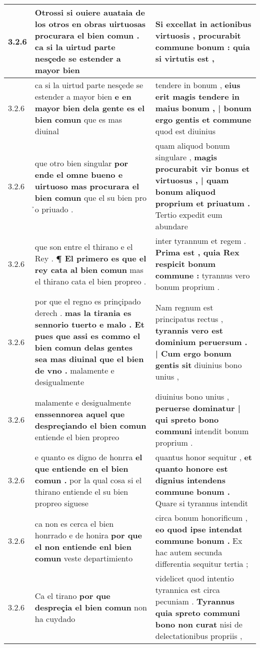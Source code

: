 \begin{tabular}{|p{1cm}|p{6.5cm}|p{6.5cm}|}
3.2.6 & Otrossi si ouiere auataia de los otros \textbf{ en obras uirtuosas procurara el bien comun . } ca si la uirtud parte nesçede se estender a mayor bien & Si excellat in actionibus virtuosis , \textbf{ procurabit commune bonum : } quia si virtutis est , \\\hline
3.2.6 & ca si la uirtud parte nesçede se estender a mayor bien \textbf{ e en mayor bien dela gente es el bien comun } que es mas diuinal & tendere in bonum , \textbf{ eius erit magis tendere in maius bonum , | bonum ergo gentis et commune } quod est diuinius \\\hline
3.2.6 & que otro bien singular \textbf{ por ende el omne bueno e uirtuoso mas procurara el bien comun } que el su bien pro ̉o priuado . & quam aliquod bonum singulare , \textbf{ magis procurabit vir bonus et virtuosus , | quam bonum aliquod proprium et priuatum . } Tertio expedit eum abundare \\\hline
3.2.6 & que son entre el thirano e el Rey . \textbf{ ¶ El primero es que el rey cata al bien comun } mas el thirano cata el bien propreo . & inter tyrannum et regem . \textbf{ Prima est , quia Rex respicit bonum commune : } tyrannus vero bonum proprium . \\\hline
3.2.6 & por que el regno es prinçipado derech . \textbf{ mas la tirania es sennorio tuerto e malo . Et pues que assi es commo el bien comun delas gentes sea mas diuinal que el bien de vno . } malamente e desigualmente & Nam regnum est principatus rectus , \textbf{ tyrannis vero est dominium peruersum . | Cum ergo bonum gentis sit } diuinius bono unius , \\\hline
3.2.6 & malamente e desigualmente \textbf{ enssennorea aquel que despreçiando el bien comun } entiende el bien propreo & diuinius bono unius , \textbf{ peruerse dominatur | qui spreto bono communi } intendit bonum proprium . \\\hline
3.2.6 & e quanto es digno de honrra \textbf{ el que entiende en el bien comun . } por la qual cosa si el thirano entiende el su bien propreo siguese & quantus honor sequitur , \textbf{ et quanto honore est dignius intendens commune bonum . } Quare si tyrannus intendit \\\hline
3.2.6 & ca non es cerca el bien honrrado e de honira \textbf{ por que el non entiende enl bien comun } veste departimiento & circa bonum honorificum , \textbf{ eo quod ipse intendat commune bonum . } Ex hac autem secunda differentia sequitur tertia ; \\\hline
3.2.6 & Ca el tirano \textbf{ por que despreçia el bien comun } non ha cuydado & videlicet quod intentio tyrannica est circa pecuniam . \textbf{ Tyrannus quia spreto communi bono non curat } nisi de delectationibus propriis , \\\hline

\end{tabular}
